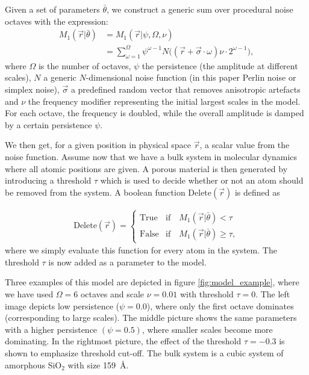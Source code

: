 \documentclass[aps,pre,twocolumn,letterpaper,floatfix,showpacs]{revtex4}
\begin{document}
Given a set of parameters $\bar \theta$, we construct a generic sum over procedural noise octaves with the expression:
\begin{align}
  M_1(\vec r |\bar \theta) &= M_1(\vec r | \psi, \Omega, \nu)\nonumber\\
  &= \sum_{\omega=1}^{\Omega} \psi^{\omega-1}   N\big((\vec r + \vec\sigma \cdot \omega)\nu \cdot 2^{\omega-1} \big),
\label{eq:noisemodel1}
\end{align}
where $\Omega$ is the number of octaves, $\psi$ the persistence (the amplitude at different scales),
$N$ a generic $N$-dimensional noise function (in this paper Perlin noise or simplex noise), $\vec \sigma$ a predefined random
vector that removes anisotropic artefacts and $\nu$ the frequency modifier representing
the initial largest scales in the model. For each octave, the frequency is doubled, while the overall amplitude is damped by a certain persistence $\psi$.

We then get, for a given position in physical space $\vec r$, a scalar value from the noise function.
Assume now that we have a bulk system in molecular dynamics where all atomic positions are given.
A porous material is then generated by introducing a threshold $\tau$ which is used to decide whether or not an atom should be removed from the system.
A boolean function $\text{Delete}(\vec r)$ is defined as

\begin{align}
  \text{Delete}(\vec r) = 
  \begin{cases} 
    \text{True} & \text{if} \quad M_1(\vec r |\bar \theta) < \tau \\
    \text{False} & \text{if} \quad M_1(\vec r |\bar \theta) \geq \tau,
  \end{cases}
\end{align}
where we simply evaluate this function for every atom in the system.
The threshold $\tau$ is now added as a parameter to the model.

Three examples of this model are depicted in figure \ref{fig:model_example}, where we have
used $\Omega=6$ octaves and scale $\nu=0.01$ with threshold $\tau=0$. The left
image depicts low persistence ($\psi = 0.0$), where only the first octave dominates
(corresponding to large scales). The middle picture shows the same parameters with
a higher persistence $(\psi = 0.5)$, where smaller scales become more dominating.
In the rightmost picture, the effect of the threshold $\tau = -0.3$ is shown to emphasize threshold cut-off.
The bulk system is a cubic system of amorphous SiO$_2$ with size \SI{159}{\angstrom}.
\end{document}
